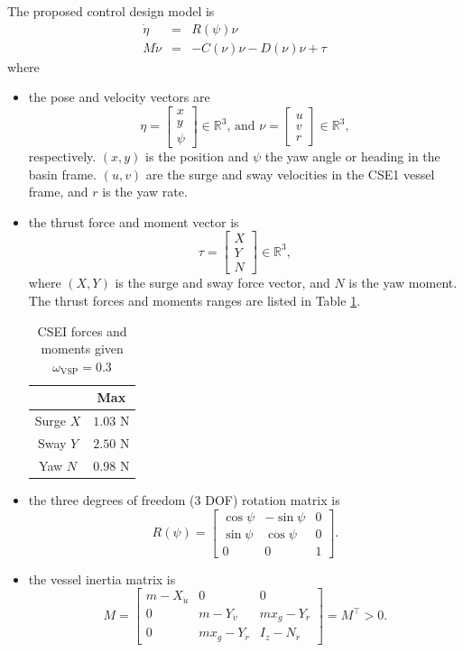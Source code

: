 \documentclass[a4paper,twoside,english]{report}
\providecommand{\tabularnewline}{\\}
\begin{document}
The proposed control design model is
\begin{eqnarray}
\dot{\eta} & = & R\left(\psi\right)\nu\label{eq: CSE1 kinematics}\\
M\dot{\nu} & = & -C\left(\nu\right)\nu-D\left(\nu\right)\nu+\tau\label{eq: CSE1 kinetics}
\end{eqnarray}
where
\begin{itemize}
\item the pose and velocity vectors are
\[
\eta=\left[\begin{array}{c}
x\\
y\\
\psi
\end{array}\right]\in\mathbb{R}^{3}\text{, and }\nu=\left[\begin{array}{c}
u\\
v\\
r
\end{array}\right]\in\mathbb{R}^{3},
\]
respectively. $\left(x,y\right)$ is the position and $\psi$ the
yaw angle or heading in the basin frame. $\left(u,v\right)$ are the
surge and sway velocities in the CSE1 vessel frame, and $r$ is the
yaw rate.
\item the thrust force and moment vector is
\[
\tau=\left[\begin{array}{c}
X\\
Y\\
N
\end{array}\right]\in\mathbb{R}^{3},
\]
where $\left(X,Y\right)$ is the surge and sway force vector, and
$N$ is the yaw moment. The thrust forces and moments ranges are listed
in Table \ref{tab: CSEI Thust Moment}.
\begin{table}
\begin{centering}
\begin{tabular}{cc}
 & Max\tabularnewline
\midrule 
Surge $X$  & $1.03$ N\tabularnewline
Sway $Y$  & $2.50$ N\tabularnewline
Yaw $N$  & $0.98$ N\tabularnewline
\bottomrule
\end{tabular}
\par\end{centering}
\caption{\label{tab: CSEI Thust Moment}CSEI forces and moments given $\omega_{\text{VSP}}=0.3$}
\end{table}
\item the three degrees of freedom (3 DOF) rotation matrix is
\[
R\left(\psi\right)=\left[\begin{array}{ccc}
\cos\psi & -\sin\psi & 0\\
\sin\psi & \cos\psi & 0\\
0 & 0 & 1
\end{array}\right].
\]
\item the vessel inertia matrix is
\[
M=\left[\begin{array}{ccc}
m-X_{\dot{u}} & 0 & 0\\
0 & m-Y_{\dot{v}} & mx_{g}-Y_{\dot{r}}\\
0 & mx_{g}-Y_{\dot{r}} & I_{z}-N_{\dot{r}}
\end{array}\right]=M^{\top}>0.
\]
 

\end{itemize}
\end{document}
